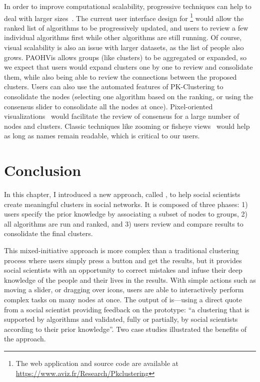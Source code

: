 In order to improve computational scalability, progressive techniques can help to deal with larger sizes~\cite{feketeProgressiveDataAnalysis2019}.
The current user interface design for \pkclustering\footnote{The web application and source code are available at \url{https://www.aviz.fr/Research/Pkclustering}} would allow the ranked list of algorithms to be progressively updated, and users to review a few individual algorithms first while other algorithms are still running.  Of course, visual scalability is also an issue with larger datasets, as the list of people also grows.
PAOHVis allows groups (like clusters) to be aggregated or expanded, so we expect that users would expand clusters one by one to review and consolidate them, while also being able to review the connections between the proposed clusters.
Users can also use the automated features of PK-Clustering to consolidate the nodes (\eg selecting one algorithm based on the ranking, or using the consensus slider to consolidate all the nodes at once).
Pixel-oriented visualizations~\cite{keimDesigningPixelorientedVisualization2000} would facilitate the review of consensus for a large number of nodes and clusters.
Classic techniques like zooming or fisheye views~\cite{jakobsenEvaluatingFisheyeView2006, rao94} would help as long as names remain readable, which is critical to our users.

\section{Conclusion}

In this chapter, I introduced a new approach, called \pkclustering, to help social scientists create meaningful clusters in social networks. It is composed of three phases: 1) users specify the prior knowledge by associating a subset of nodes to groups, 2) all algorithms are run and ranked, and 3) users review and compare results to consolidate the final clusters.

This mixed-initiative approach is more complex than a traditional clustering process where users simply press a button and get the results, but it provides social scientists with an opportunity to correct mistakes and infuse their deep knowledge of the people and their lives in the results.
With simple actions such as moving a slider, or dragging over icons, users are able to interactively perform complex tasks on many nodes at once. The output of \pkclustering is---using a direct quote from a social scientist providing feedback on the prototype:  ``a clustering that is supported by algorithms and validated, fully or partially, by social scientists according to their prior knowledge''. Two case studies illustrated the benefits of the approach.

